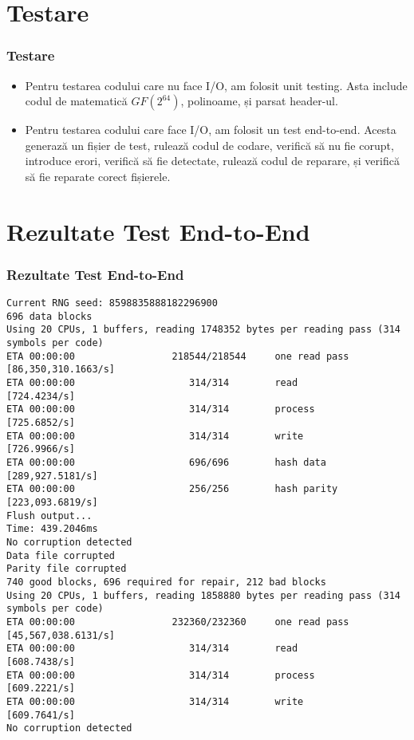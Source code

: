 \documentclass{beamer}
\begin{document}
\section{Testare}
\begin{frame}
\frametitle{Testare}
\begin{itemize}
\item
Pentru testarea codului care nu face I/O, am folosit unit testing.
Asta include codul de matematică $GF(2^{64})$, polinoame, și parsat header-ul.

\item
Pentru testarea codului care face I/O, am folosit un test end-to-end.
Acesta generază un fișier de test, rulează codul de codare, verifică să nu fie corupt,
introduce erori, verifică să fie detectate, rulează codul de reparare, și verifică să fie reparate corect fișierele.

\end{itemize}
\end{frame}

\section{Rezultate Test End-to-End}
\begin{frame}[fragile]
\frametitle{Rezultate Test End-to-End}
\begin{tiny}
\begin{verbatim}
Current RNG seed: 8598835888182296900
696 data blocks
Using 20 CPUs, 1 buffers, reading 1748352 bytes per reading pass (314 symbols per code)
ETA 00:00:00                 218544/218544     one read pass [86,350,310.1663/s]
ETA 00:00:00                    314/314        read          [724.4234/s]
ETA 00:00:00                    314/314        process       [725.6852/s]
ETA 00:00:00                    314/314        write         [726.9966/s]                                                                                                               
ETA 00:00:00                    696/696        hash data     [289,927.5181/s]
ETA 00:00:00                    256/256        hash parity   [223,093.6819/s]                                                                                                           
Flush output...
Time: 439.2046ms
No corruption detected
Data file corrupted
Parity file corrupted
740 good blocks, 696 required for repair, 212 bad blocks
Using 20 CPUs, 1 buffers, reading 1858880 bytes per reading pass (314 symbols per code)
ETA 00:00:00                 232360/232360     one read pass [45,567,038.6131/s]
ETA 00:00:00                    314/314        read          [608.7438/s]
ETA 00:00:00                    314/314        process       [609.2221/s]
ETA 00:00:00                    314/314        write         [609.7641/s]                                                                                                               
No corruption detected
\end{verbatim}
\end{tiny}
\end{frame}
\end{document}
